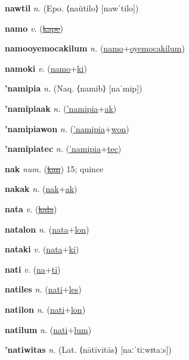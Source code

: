\textbf{\hypertarget{nawtil}{nawtil}} \textit{n.} (Epo. ⟨naŭtilo⟩ [nawˈtilo])


\textbf{\hypertarget{namo}{namo}} \textit{v.} (\hyperlink{kape}{\sout{kape}})


\textbf{\hypertarget{namooyemocakilum}{namooyemocakilum}} \textit{n.} (\hyperlink{namo}{namo}+\allowbreak \hyperlink{oyemocakilum}{oyemocakilum})


\textbf{\hypertarget{namoki}{namoki}} \textit{v.} (\hyperlink{namo}{namo}+\allowbreak \hyperlink{ki}{ki})


\textbf{\hypertarget{'namipia}{'namipia}} \textit{n.} (Naq. ⟨namib⟩ [naˈmip])


\textbf{\hypertarget{'namipiaak}{'namipiaak}} \textit{n.} (\hyperlink{'namipia}{'namipia}+\allowbreak \hyperlink{ak}{ak})


\textbf{\hypertarget{'namipiawon}{'namipiawon}} \textit{n.} (\hyperlink{'namipia}{'namipia}+\allowbreak \hyperlink{won}{won})


\textbf{\hypertarget{'namipiatec}{'namipiatec}} \textit{n.} (\hyperlink{'namipia}{'namipia}+\allowbreak \hyperlink{tec}{tec})


\textbf{\hypertarget{nak}{nak}} \textit{num.} (\hyperlink{kan}{\sout{kan}})
15; quince

\textbf{\hypertarget{nakak}{nakak}} \textit{n.} (\hyperlink{nak}{nak}+\allowbreak \hyperlink{ak}{ak})


\textbf{\hypertarget{nata}{nata}} \textit{v.} (\hyperlink{kala}{\sout{kala}})


\textbf{\hypertarget{natalon}{natalon}} \textit{n.} (\hyperlink{nata}{nata}+\allowbreak \hyperlink{lon}{lon})


\textbf{\hypertarget{nataki}{nataki}} \textit{v.} (\hyperlink{nata}{nata}+\allowbreak \hyperlink{ki}{ki})


\textbf{\hypertarget{nati}{nati}} \textit{v.} (\hyperlink{na}{na}+\allowbreak \hyperlink{ti}{ti})


\textbf{\hypertarget{natiles}{natiles}} \textit{n.} (\hyperlink{nati}{nati}+\allowbreak \hyperlink{les}{les})


\textbf{\hypertarget{natilon}{natilon}} \textit{n.} (\hyperlink{nati}{nati}+\allowbreak \hyperlink{lon}{lon})


\textbf{\hypertarget{natilum}{natilum}} \textit{n.} (\hyperlink{nati}{nati}+\allowbreak \hyperlink{lum}{lum})


\textbf{\hypertarget{'natiwitas}{'natiwitas}} \textit{n.} (Lat. ⟨nātīvitās⟩ [naːˈtiːwɪtaːs])


